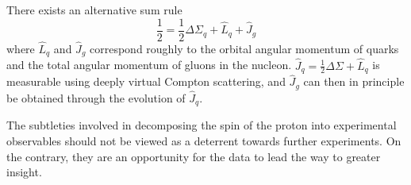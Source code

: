 There exists an alternative sum rule \cite{Jaffe1990509, Ji:1996ek}
%
\begin{equation}
  \frac{1}{2} = \frac{1}{2}\Delta \Sigma_q + \hat{L}_q + \hat{J}_g
\end{equation}
%
where \(\hat{L}_q\) and \(\hat{J}_g\) correspond roughly to the orbital angular momentum of quarks and the total angular momentum of gluons in the nucleon. \(\hat{J}_q = \frac{1}{2}\Delta \Sigma + \hat{L}_q\) is measurable using deeply virtual Compton scattering, and \(\hat{J}_g\) can then in principle be obtained through the evolution of \(\hat{J}_q\).

The subtleties involved in decomposing the spin of the proton into experimental observables should not be viewed as a deterrent towards further experiments.  On the contrary, they are an opportunity for the data to lead the way to greater insight.
